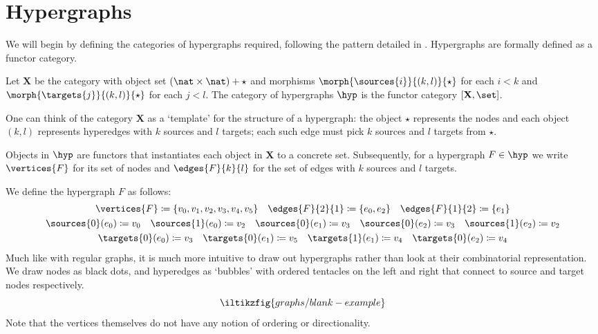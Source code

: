 \section{Hypergraphs}

We will begin by defining the categories of hypergraphs required, following the
pattern detailed in \cite{bonchi2022string}.
Hypergraphs are formally defined as a functor category.

\begin{definition}
    Let \(\mathbf{X}\) be the category with object set
    \((\nat \times \nat) + \star\) and morphisms
    \(\morph{\sources{i}}{(k,l)}{\star}\) for each \(i < k\)
    and \(\morph{\targets{j}}{(k,l)}{\star}\) for each \(j < l\).
    The category of hypergraphs \(\hyp\) is the functor category
    \([\mathbf{X}, \set]\).
\end{definition}

One can think of the category \(\mathbf{X}\) as a `template' for the structure
of a hypergraph: the object \(\star\) represents the nodes and each object
\((k, l)\) represents hyperedges with \(k\) sources and \(l\) targets; each such
edge must pick \(k\) sources and \(l\) targets from \(\star\).

Objects in \(\hyp\) are functors that instantiates each object in \(\mathbf{X}\)
to a concrete set.
Subsequently, for a hypergraph \(F \in \hyp\) we write \(\vertices{F}\) for its
set of nodes and \(\edges{F}{k}{l}\) for the set of edges with \(k\) sources and
\(l\) targets.

\begin{example}\label{ex:hypergraph}
    We define the hypergraph \(F\) as follows:
    \begin{gather*}
        \vertices{F} \coloneqq \{v_0,v_1,v_2,v_3,v_4,v_5\}
        \quad
        \edges{F}{2}{1} \coloneqq \{e_0,e_2\}
        \quad
        \edges{F}{1}{2} \coloneqq \{e_1\}
        \\
        \sources{0}(e_0) \coloneqq v_0
        \quad
        \sources{1}(e_0) \coloneqq v_2
        \quad
        \sources{0}(e_1) \coloneqq v_3
        \quad
        \sources{0}(e_2) \coloneqq v_3
        \quad
        \sources{1}(e_2) \coloneqq v_2
        \\
        \targets{0}(e_0) \coloneqq v_3
        \quad
        \targets{0}(e_1) \coloneqq v_5
        \quad
        \targets{1}(e_1) \coloneqq v_4
        \quad
        \targets{0}(e_2) \coloneqq v_4
    \end{gather*}
    Much like with regular graphs, it is much more intuitive to draw out hypergraphs
    rather than look at their combinatorial representation.
    We draw nodes as black dots, and hyperedges as `bubbles' with ordered tentacles
    on the left and right that connect to source and target nodes respectively.
    \[
        \iltikzfig{graphs/blank-example}
    \]
    Note that the vertices themselves do not have any notion of ordering or
    directionality.
\end{example}

